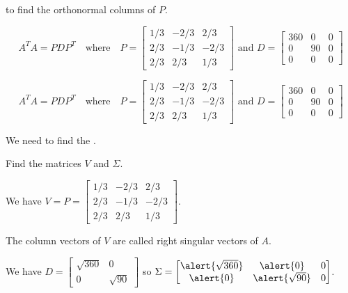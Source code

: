 \documentclass[xcolor=dvipsnames,aspectratio=169,t]{beamer}
\begin{document}
\begin{frame}
  \pause
  \ii {} to find the orthonormal columns of $P$.
  \ei

  \vspace{-0.1in}

  \[ A^TA = PDP^T \quad \mbox{where} \quad 
  P = \begin{bmatrix} 1/3 & -2/3 & 2/3 \\ 2/3 & -1/3 & -2/3 \\ 2/3 & 2/3 & 1/3 \end{bmatrix} \mbox{ and } D = \begin{bmatrix} 360 & 0 & 0 \\ 0 & 90 & 0 \\ 0 & 0 & 0 \end{bmatrix} \]
\end{frame}


\begin{frame}

  \[ A^TA = PDP^T \quad \mbox{where} \quad 
  P = \begin{bmatrix} 1/3 & -2/3 & 2/3 \\ 2/3 & -1/3 & -2/3 \\ 2/3 & 2/3 & 1/3 \end{bmatrix} \mbox{ and } D = \begin{bmatrix} 360 & 0 & 0 \\ 0 & 90 & 0 \\ 0 & 0 & 0 \end{bmatrix} \]

  We need to find the .
  \medskip
  
  \pause
  \bb
  \addtocounter{enumi}{1}
  \ii \alert{Find the matrices $V$ and $\Sigma$.}
  \ee
  \medskip

  \bi
  \ii We have $V = P =  \begin{bmatrix} 1/3 & -2/3 & 2/3 \\ 2/3 & -1/3 & -2/3 \\ 2/3 & 2/3 & 1/3 \end{bmatrix} $.
  \smallskip
  
  The column vectors of $V$ are called \alert{right singular vectors} of $A$.
  \bigskip

  \ii We have $D = \begin{bmatrix} \sqrt{360} & 0 \\ 0 & \sqrt{90} \end{bmatrix}$ so $\Sigma = \begin{bmatrix} \alert{\sqrt{360}} & \alert{0} & 0 \\
  \alert{0} & \alert{\sqrt{90}} & 0 \end{bmatrix}$.
  \ei
\end{frame}
\end{document}
